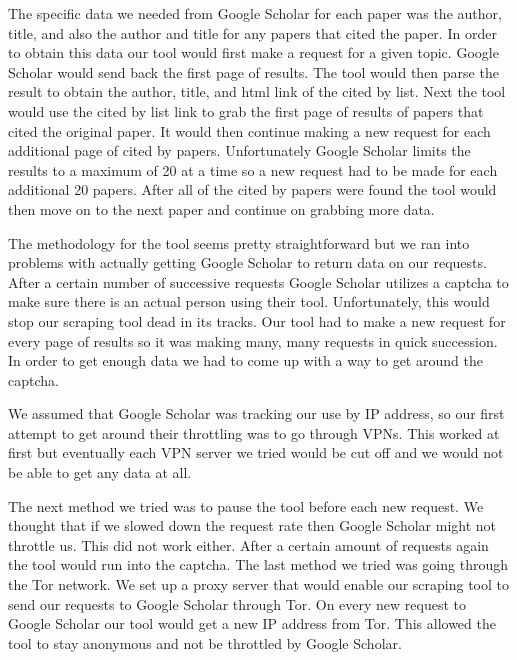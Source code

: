\documentclass[letterpaper]{article}
\begin{document}
The specific data we needed from Google Scholar for each paper was the author, title, and also the author and title for any papers that cited the paper.
In order to obtain this data our tool would first make a request for a given topic.
Google Scholar would send back the first page of results.
The tool would then parse the result to obtain the author, title, and html link of the cited by list.
Next the tool would use the cited by list link to grab the first page of results of papers that cited the original paper.
It would then continue making a new request for each additional page of cited by papers. Unfortunately Google Scholar limits the results to a maximum of 20 at a time so a new request had to be made for each additional 20 papers.
After all of the cited by papers were found the tool would then move on to the next paper and continue on grabbing more data.

The methodology for the tool seems pretty straightforward but we ran into problems with actually getting Google Scholar to return data on our requests.
After a certain number of successive requests Google Scholar utilizes a captcha to make sure there is an actual person using their tool.
Unfortunately, this would stop our scraping tool dead in its tracks.
Our tool had to make a new request for every page of results so it was making many, many requests in quick succession.
In order to get enough data we had to come up with a way to get around the captcha.

We assumed that Google Scholar was tracking our use by IP address, so our first attempt to get around their throttling was to go through VPNs.
This worked at first but eventually each VPN server we tried would be cut off and we would not be able to get any data at all.

The next method we tried was to pause the tool before each new request.
We thought that if we slowed down the request rate then Google Scholar might not throttle us.
This did not work either. After a certain amount of requests again the tool would run into the captcha.
The last method we tried was going through the Tor network.
We set up a proxy server that would enable our scraping tool to send our requests to Google Scholar through Tor.
On every new request to Google Scholar our tool would get a new IP address from Tor.
This allowed the tool to stay anonymous and not be throttled by Google Scholar.
\end{document}
